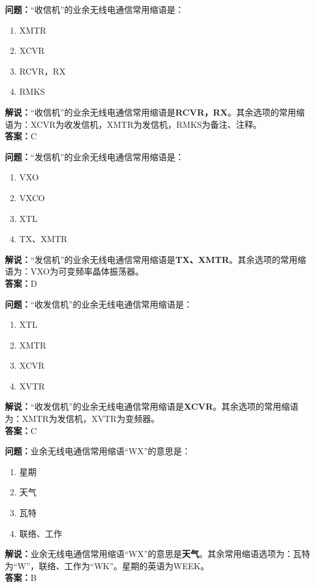 \bigskip


\noindent\textbf{问题：}“收信机”的业余无线电通信常用缩语是：
\begin{enumerate}[label=\Alph*), leftmargin=3em]
\item XMTR
\item XCVR
\item RCVR，RX
\item RMKS
\end{enumerate}
\noindent\textbf{解说：}“收信机”的业余无线电通信常用缩语是\textbf{RCVR，RX}。其余选项的常用缩语为：XCVR为收发信机，XMTR为发信机，RMKS为备注、注释。\\\noindent\textbf{答案：}C



\bigskip


\noindent\textbf{问题：}“发信机”的业余无线电通信常用缩语是：
\begin{enumerate}[label=\Alph*), leftmargin=3em]
\item VXO
\item VXCO
\item XTL
\item TX、XMTR
\end{enumerate}
\noindent\textbf{解说：}“发信机”的业余无线电通信常用缩语是\textbf{TX、XMTR}。其余选项的常用缩语为：VXO为可变频率晶体振荡器。\\\noindent\textbf{答案：}D



\bigskip


\noindent\textbf{问题：}“收发信机”的业余无线电通信常用缩语是：
\begin{enumerate}[label=\Alph*), leftmargin=3em]
\item XTL
\item XMTR
\item XCVR
\item XVTR
\end{enumerate}
\noindent\textbf{解说：}“收发信机”的业余无线电通信常用缩语是\textbf{XCVR}。其余选项的常用缩语为：XMTR为发信机，XVTR为变频器。\\\noindent\textbf{答案：}C





\bigskip


\noindent\textbf{问题：}业余无线电通信常用缩语“WX”的意思是：
\begin{enumerate}[label=\Alph*), leftmargin=3em]
\item 星期
\item 天气
\item 瓦特
\item 联络、工作
\end{enumerate}
\noindent\textbf{解说：}业余无线电通信常用缩语“WX”的意思是\textbf{天气}。其余常用缩语选项为：瓦特为“W”，联络、工作为“WK”。星期的英语为WEEK。\\\noindent\textbf{答案：}B



